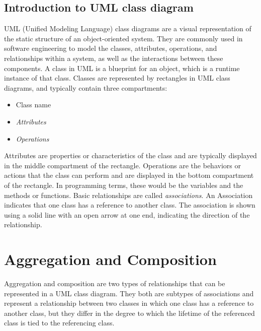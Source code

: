 \documentclass[
	12pt,
    a4paper,
    egregdoesnotlikesansseriftitles, %
    toc=chapterentrywithdots,
    oneside, openany,
    titlepage,
    parskip=half,
    headings=normal,  %
    listof=totoc,
    bibliography=totocnumbered,
    index=totoc,
    captions=tableheading,  %
    listof=flat,
    numbers=noenddot, %
    final]
    {scrbook}
\begin{document}
\section{Introduction to UML class diagram}
UML (Unified Modeling Language) class diagrams are a visual representation of the static structure of an object-oriented system. 
They are commonly used in software engineering to model the classes, attributes, operations, and relationships within a system, as well as the interactions between these components. 
A class in UML is a blueprint for an object, which is a runtime instance of that class. 
Classes are represented by rectangles in UML class diagrams, and typically contain three compartments: 
\begin{itemize}
	\item Class name
	\item \emph{Attributes}
	\item \emph{Operations}
\end{itemize}
Attributes are properties or characteristics of the class and are typically displayed in the middle compartment of the rectangle.
Operations are the behaviors or actions that the class can perform and are displayed in the bottom compartment of the rectangle.
In programming terms, these would be the variables and the methods or functions.
Basic relationships are called \emph{associations}. 
An Association indicates that one class has a reference to another class. \cite[p. 108-111]{uml}
The association is shown using a solid line with an open arrow at one end, indicating the direction of the relationship. \cite[p. 142-143]{uml}


%


\chapter{Aggregation and Composition}
Aggregation and composition are two types of relationships that can be represented in a UML class diagram. 
They both are subtypes of associations and represent a relationship between two classes in which one class has a reference to another class, but they differ in the degree to which the lifetime of the referenced class is tied to the referencing class.
\end{document}
